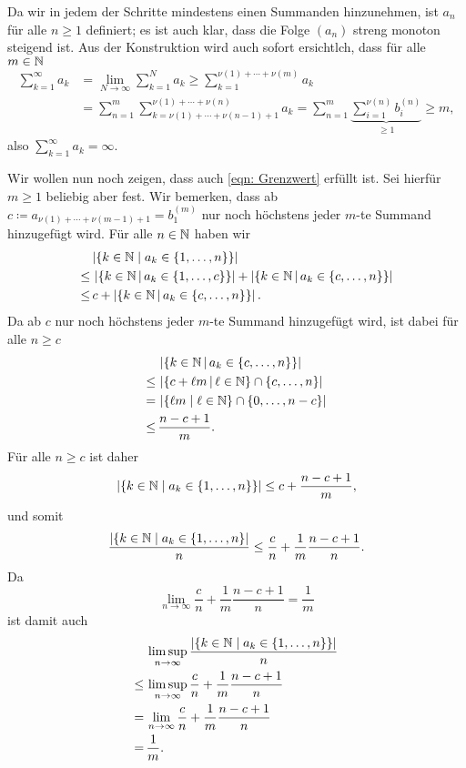 \documentclass[a4paper,10pt]{article}
\begin{document}
Da wir in jedem der Schritte mindestens einen Summanden hinzunehmen, ist $a_n$ für alle $n \geq 1$ definiert; es ist auch klar, dass die Folge $(a_n)$ streng monoton steigend ist. Aus der Konstruktion wird auch sofort ersichtlch, dass für alle $m \in \mathbb{N}$
\begin{align*}
 \sum_{k=1}^\infty a_k
 &= \lim_{N \to \infty} \sum_{k=1}^N a_k
 \geq \sum_{k=1}^{\nu(1)+\dotsb+\nu(m)} a_k \\
 &= \sum_{n=1}^m \sum_{k=\nu(1)+\dotsb+\nu(n-1)+1}^{\nu(1)+\dotsb+\nu(n)} a_k
 = \sum_{n=1}^m \underbrace{\sum_{i=1}^{\nu(n)} b^{(n)}_i}_{\geq 1}
 \geq m,
\end{align*}
also $\sum_{k=1}^\infty a_k = \infty$.

Wir wollen nun noch zeigen, dass auch \eqref{eqn: Grenzwert} erfüllt ist. Sei hierfür $m \geq 1$ beliebig aber fest. Wir bemerken, dass ab $c \coloneqq a_{\nu(1)+\dotsb+\nu(m-1)+1} = b^{(m)}_1$ nur noch höchstens jeder $m$-te Summand hinzugefügt wird. Für alle $n \in \mathbb{N}$ haben wir
\begin{align*}
     &\, |\{k \in \mathbb{N} \mid a_k \in \{1, \dotsc, n\}\}| \\
 \leq&\, \left|\left\{k \in \mathbb{N} \,\middle|\, a_k \in \left\{1, \dotsc, c\right\}\right\}\right|
         + \left|\left\{k \in \mathbb{N} \,\middle|\, a_k \in \left\{c, \dotsc, n\right\}\right\}\right| \\
  \leq&\, c + \left|\left\{k \in \mathbb{N} \,\middle|\, a_k \in \left\{c, \dotsc, n\right\}\right\}\right|.
\end{align*}
Da ab $c$ nur noch höchstens jeder $m$-te Summand hinzugefügt wird, ist dabei für alle $n \geq c$
\begin{align*}
     &\, \left|\left\{k \in \mathbb{N} \,\middle|\, a_k \in \left\{c, \dotsc, n\right\}\right\}\right| \\
 \leq&\, \left|\left\{c + \ell m \,\middle|\, \ell \in \mathbb{N}\right\} \cap \left\{c, \dotsc, n\right\}\right| \\
    =&\, \left|\{\ell m \mid \ell \in \mathbb{N}\} \cap \left\{0, \dotsc, n-c\right\}\right| \\
 \leq&\, \frac{n-c+1}{m}.
\end{align*}
Für alle $n \geq c$ ist daher
\[
 |\{k \in \mathbb{N} \mid a_k \in \{1, \dotsc, n\}\}|
 \leq c + \frac{n-c + 1}{m},
\]
und somit
\[
 \frac{|\{k \in \mathbb{N} \mid a_k \in \{1, \dotsc, n\}|}{n}
 \leq \frac{c}{n} + \frac{1}{m} \frac{n-c + 1}{n}.
\]
Da
\[
 \lim_{n \to \infty}\frac{c}{n} + \frac{1}{m} \frac{n-c + 1}{n}
 = \frac{1}{m}
\]
ist damit auch
\begin{align*}
     &\, \limsup_{n \to \infty} \frac{|\{k \in \mathbb{N} \mid a_k \in \{1, \dotsc, n\}\}|}{n} \\
 \leq&\, \limsup_{n \to \infty} \frac{c}{n} + \frac{1}{m} \frac{n-c + 1}{n} \\
    =&\, \lim_{n \to \infty} \frac{c}{n} + \frac{1}{m} \frac{n-c + 1}{n} \\
    =&\, \frac{1}{m}.
\end{align*}
\end{document}

